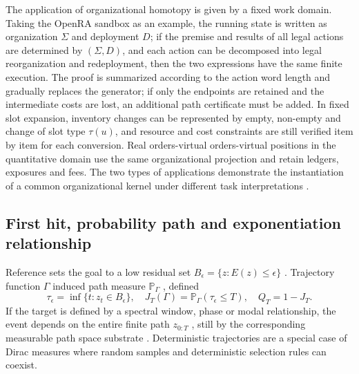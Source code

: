 \documentclass[11pt,a4paper]{article}
\theoremstyle{plain}
\theoremstyle{definition}
\theoremstyle{remark}
\begin{document}
\begin{CJK*}
The application of organizational homotopy is given by a fixed work domain. Taking the OpenRA sandbox as an example, the running state is written as organization $\Sigma$ and deployment $D$; if the premise and results of all legal actions are determined by $(\Sigma,D)$, and each action can be decomposed into legal reorganization and redeployment, then the two expressions have the same finite execution. The proof is summarized according to the action word length and gradually replaces the generator; if only the endpoints are retained and the intermediate costs are lost, an additional path certificate must be added. In fixed slot expansion, inventory changes can be represented by empty, non-empty and change of slot type $\tau(u)$, and resource and cost constraints are still verified item by item for each conversion. Real orders-virtual orders-virtual positions in the quantitative domain use the same organizational projection and retain ledgers, exposures and fees. The two types of applications demonstrate the instantiation of a common organizational kernel under different task interpretations \cite{S17}.

\subsection { First hit, probability path and exponentiation relationship }

Reference \cite{S33} sets the goal to a low residual set $B_\epsilon=\{z:E(z)\le\epsilon\}$ . Trajectory function $\Gamma$ induced path measure $\mathbb P_\Gamma$ , defined \[
 \tau_\epsilon=\inf\{t:z_t\in B_\epsilon\},\quad
 J_T(\Gamma)=\mathbb P_\Gamma(\tau_\epsilon\le T),\quad
 Q_T=1-J_T.
\] If the target is defined by a spectral window, phase or modal relationship, the event depends on the entire finite path $z_{0:T}$ , still by the corresponding measurable path space substrate . Deterministic trajectories are a special case of Dirac measures where random samples and deterministic selection rules can coexist.


\end{CJK*}
\end{document}
